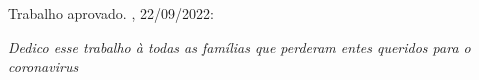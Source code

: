 \documentclass[
	12pt,				%
	oneside,			%
	a4paper,			%
	english,			%
	brazil				%
	hyperref = {colorlinks, citecolor=c1d, linkcolor=c2d, urlcolor=c3d, colorlinks}
	]{abntex2}
\begin{document}
% 

\begin{folhadeaprovacao}
  \begin{center}
    {\ABNTEXchapterfont\large\imprimirautor}

    \vspace*{\fill}\vspace*{\fill}
    \begin{center}
      \ABNTEXchapterfont\bfseries\Large\imprimirtitulo
    \end{center}
    \vspace*{\fill}
    
    \hspace{.45\textwidth}
    \begin{minipage}{.5\textwidth}
        \imprimirpreambulo
    \end{minipage}%
    \vspace*{\fill}
   \end{center}
        
   Trabalho aprovado. \imprimirlocal, 22/09/2022:

      
   \begin{center}
    \vspace*{0.5cm}
    {\large\imprimirlocal}
    \par
    {\large\imprimirdata}
    \vspace*{1cm}
  \end{center}
  
\end{folhadeaprovacao}

\begin{dedicatoria}
   \vspace*{\fill}
   \centering
   \noindent
   \textit{Dedico esse trabalho à todas as famílias que perderam entes queridos para o coronavirus}\vspace*{\fill}
\end{dedicatoria}
\end{document}
